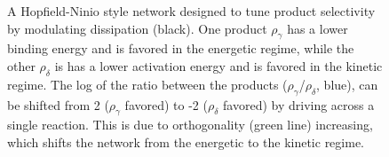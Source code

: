 \begin{figure}[htbp]
\resizebox{1\columnwidth}{!}{
 }
\caption{A Hopfield-Ninio style network designed to tune product selectivity by modulating dissipation (black).  One product $\rho_{\gamma}$ has a lower binding energy and is favored in the energetic regime, while the other $\rho_{\delta}$ is has a lower activation energy and is favored in the kinetic regime.  The log of the ratio between the products ($\rho_{\gamma}$/$\rho_{\delta}$, blue), can be shifted from 2 ($\rho_{\gamma}$  favored) to -2 ($\rho_{\delta}$ favored) by driving across a single reaction.  This is due to orthogonality (green line) increasing, which shifts the network from the energetic to the kinetic regime. \label{fig:hop_switch}}

\end{figure}

